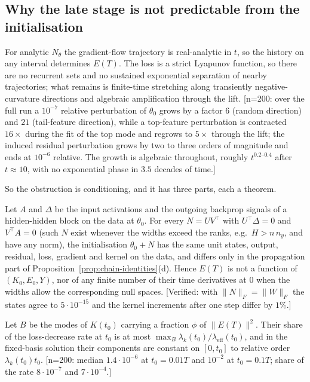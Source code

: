 \subsection{Why the late stage is not predictable from the initialisation}
\label{ssec:chain-impossible}

\begin{proposition}
\label{prop:nochaos}
For analytic $N_\theta$ the gradient-flow trajectory is real-analytic in $t$, so
the history on any interval determines $E(T)$. The loss is a strict Lyapunov
function, so there are no recurrent sets and no sustained exponential
separation of nearby trajectories; what remains is finite-time stretching
along transiently negative-curvature directions and algebraic amplification
through the lift. [n=200: over the full run a $10^{-7}$ relative perturbation of $\theta_0$ grows
by a factor $6$ (random direction) and $21$ (tail-feature direction), while a
top-feature perturbation is contracted $16\times$ during the fit of the top mode
and regrows to $5\times$ through the lift; the induced residual perturbation
grows by two to three orders of magnitude and ends at $10^{-6}$ relative. The
growth is algebraic throughout, roughly $t^{0.2\text{--}0.4}$ after $t\approx10$,
with no exponential phase in $3.5$ decades of time.]
\end{proposition}

So the obstruction is conditioning, and it has three parts, each a theorem.

\begin{theorem}
\label{thm:hidden}
Let $A$ and $\Delta$ be the input activations and the outgoing backprop
signals of a hidden-hidden block on the data at $\theta_0$. For every
$N=UV^{\!\top}$ with $U^{\!\top}\Delta=0$ and $V^{\!\top}A=0$ (such $N$ exist whenever the
widths exceed the ranks, e.g.\ $H>n\,n_y$, and have any norm), the
initialisation $\theta_0+N$ has the same unit states, output, residual, loss,
gradient and kernel on the data, and differs only in the propagation part of
Proposition~\ref{prop:chain-identities}(d). Hence $E(T)$ is not a function of
$(K_0,E_0,Y)$, nor of any finite number of their time derivatives at $0$ when
the widths allow the corresponding null spaces. [Verified: with
$\|N\|_F=\|W\|_F$ the states agree to $5\cdot10^{-15}$ and the kernel increments
after one step differ by $1\%$.]
\end{theorem}

\begin{proposition}[Visibility]
\label{prop:visibility}
Let $B$ be the modes of $K(t_0)$ carrying a fraction $\phi$ of $\|E(T)\|^2$. Their
share of the loss-decrease rate at $t_0$ is at most
$\max_B\lambda_k(t_0)/\lambda_{\mathrm{eff}}(t_0)$, and in the fixed-basis
solution their components are constant on $[0,t_0]$ to relative order
$\lambda_k(t_0)t_0$. [n=200: median $1.4\cdot10^{-6}$ at $t_0=0.01T$ and
$10^{-2}$ at $t_0=0.1T$; share of the rate $8\cdot10^{-7}$ and $7\cdot10^{-4}$.]
\end{proposition}

